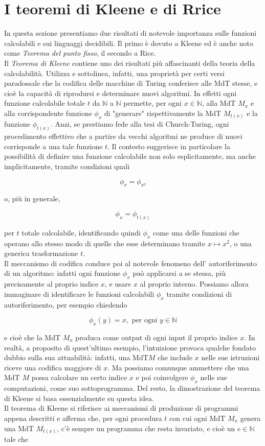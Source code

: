 \section{I teoremi di Kleene e di Rrice}

In questa sezione presentiamo due risultati di notevole importanza sulle funzioni
calcolabili e sui linguaggi decidibili. Il primo è dovuto a Kleene ed è anche noto
come \textit{Teorema del punto fisso}, il secondo a Rice.\\
Il \textit{Teorema di Kleene} contiene uno
dei risultati più affascinanti della teoria della calcolabilità. Utilizza e
sottolinea, infatti, una proprietà per certi versi paradossale che la codifica delle
macchine di Turing conferisce alle MdT stesse, e cioè la capacità di riprodursi e
determinare nuovi algoritmi. In effetti ogni funzione calcolabile totale $t$ da
$\mathbb{N}$ a $\mathbb{N}$ permette, per ogni $x \in \mathbb{N}$, alla MdT $M_x$ e
alla corrispondente funzione $\phi_x$ di "generare" rispettivamente la MdT $M_{t(x)}$
e la funzione $\phi_{t(x)}$. Anzi, se prestiamo fede alla tesi di Church-Turing, ogni
procedimento effettivo che a partire da vecchi algoritmi ne produce di nuovi
corrisponde a una tale funzione $t$. Il contesto suggerisce in particolare la
possibilità di definire una funzione calcolabile non solo esplicitamente, ma anche
implicitamente, tramite condizioni quali

\[
    \phi_x=\phi_{x^2}
\]

o, più in generale,

\[
    \phi_x=\phi_{t(x)}
\]

per $t$ totale calcolabile, identificando quindi $\phi_x$ come
una delle funzioni che operano allo stesso modo di quelle che esse determinano
tramite $x \mapsto x^2$, o una generica trasformazione $t$.\\
Il meccanismo di codifica
conduce poi al notevole fenomeno dell' autoriferimento di un algoritmo: infatti ogni
funzione $\phi_x$ può applicarsi a se stessa, più precisamente al proprio indice $x$,
e usare $x$ al proprio interno. Possiamo allora immaginare di identificare le
funzioni calcolabili $\phi_x$ tramite condizioni di autoriferimento, per esempio
chiedendo

\[
    \phi_x(y)=x, \text { per ogni } y \in \mathbb{N}
\]

e cioè che la MdT $M_x$ produca come output di ogni input il proprio indice $x$. In
realtà, a proposito di quest'ultimo esempio, l'intuizione provoca qualche fondato
dubbio sulla sua attuabilità: infatti, una $\mathrm{MdT} M$ che include $x$ nelle sue
istruzioni riceve una codifica maggiore di $x$. Ma possiamo comunque ammettere che
una MdT $M$ possa calcolare un certo indice $x$ e poi coinvolgere $\phi_x$ nelle sue
computazioni, come suo sottoprogramma. Del resto, la dimostrazione del teorema di
Kleene si basa essenzialmente su questa idea.\\
Il teorema di Kleene si riferisce ai
meccanismi di produzione di programmi appena descritti e afferma che, per ogni
procedura $t$ con cui ogni MdT $M_x$ genera una MdT $M_{t(x)}$, c'è sempre un
programma che resta invariato, e cioè un $e \in \mathbb{N}$ tale che


